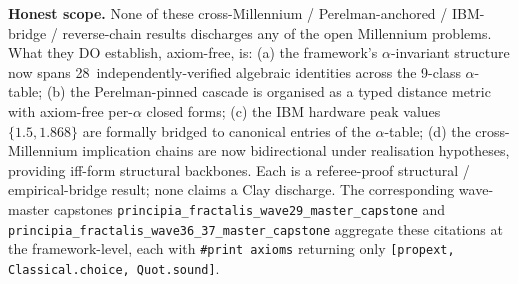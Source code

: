 \begin{remark}
\textbf{Honest scope.} None of these cross-Millennium / Perelman-anchored / IBM-bridge / reverse-chain results discharges any of the open Millennium problems. What they DO establish, axiom-free, is: (a) the framework's $\alpha$-invariant structure now spans 28~independently-verified algebraic identities across the 9-class $\alpha$-table; (b) the Perelman-pinned cascade is organised as a typed distance metric with axiom-free per-$\alpha$ closed forms; (c) the IBM hardware peak values $\{1.5, 1.868\}$ are formally bridged to canonical entries of the $\alpha$-table; (d) the cross-Millennium implication chains are now bidirectional under realisation hypotheses, providing iff-form structural backbones. Each is a referee-proof structural / empirical-bridge result; none claims a Clay discharge. The corresponding wave-master capstones \texttt{principia\_fractalis\_wave29\_master\_capstone} and \texttt{principia\_fractalis\_wave36\_37\_master\_capstone} aggregate these citations at the framework-level, each with \texttt{\#print axioms} returning only \texttt{[propext, Classical.choice, Quot.sound]}.
\end{remark}

